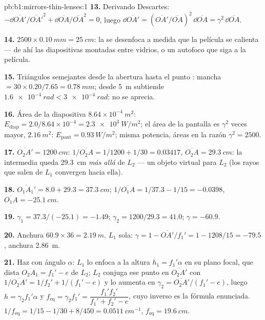 \begin{solution}{pb:b1:mirrors-thin-lenses:1}
\textbf{13.} Derivando Descartes: $-\dd\overline{OA'}/\overline{OA'}^2
+ \dd\overline{OA}/\overline{OA}^2 = 0$, luego $\dd\overline{OA'} =
(\overline{OA'}/\overline{OA})^2\,\dd\overline{OA} = \gamma^2\,\dd\overline{OA}$.

\textbf{14.} $2500 \times \qty{0.10}{mm} = \qty{25}{cm}$: la  se
desenfoca a medida que la película se calienta --- de ahí las diapositivas
montadas entre vidrios, o un autofoco que siga a la película.

\textbf{15.} Triángulos semejantes desde la abertura hasta el punto
: mancha $= 30 \times 0.20/7.65 = \qty{0.78}{mm}$; desde \qty{5}{m}
subtiende $\qty{1.6e-4}{rad} < \qty{3e-4}{rad}$: no se aprecia.

\textbf{16.} Área de la diapositiva $8.64\times10^{-4}\ \unit{m^2}$: $E_{\text{diap}}
= 2.0/8.64\times10^{-4} = \qty{2.3e3}{W/m^2}$; el área de la pantalla es $\gamma^2$
veces mayor, $\qty{2.16}{m^2}$: $E_{\text{pant}} = \qty{0.93}{W/m^2}$;
misma potencia, áreas en la razón $\gamma^2 = 2500$.

\textbf{17.} $\overline{O_2A'} = \qty{1200}{cm}$: $1/\overline{O_2A} =
1/1200 + 1/30 = 0.03417$, $\overline{O_2A} = \qty{+29.3}{cm}$: la 
intermedia queda \qty{29.3}{cm} \emph{más allá} de $L_2$ --- un objeto
virtual para $L_2$ (los rayos que salen de $L_1$ convergen hacia ella).

\textbf{18.} $\overline{O_1A_1'} = 8.0 + 29.3 = \qty{37.3}{cm}$;
$1/\overline{O_1A} = 1/37.3 - 1/15 = -0.0398$, $\overline{O_1A} =
\qty{-25.1}{cm}$.

\textbf{19.} $\gamma_1 = 37.3/(-25.1) = -1.49$; $\gamma_2 = 1200/29.3 =
41.0$; $\gamma = -60.9$.

\textbf{20.} Anchura $60.9 \times 36 = \qty{2.19}{m}$. $L_1$ sola:
$\gamma = 1 - \overline{OA'}/f_1' = 1 - 1208/15 = -79.5$, anchura
\qty{2.86}{m}.

\textbf{21.} Haz con ángulo $\alpha$: $L_1$ lo enfoca a la altura $h_1 = f_1'\alpha$
en su plano focal, que dista $\overline{O_2A_1} = f_1' - e$ de $L_2$;
$L_2$ conjuga ese punto en $\overline{O_2A'}$ con $1/\overline{O_2A'}
= 1/f_2' + 1/(f_1' - e)$ y lo aumenta en $\gamma_2 = \overline{O_2A'}/(f_1'
- e)$, luego $h = \gamma_2 f_1'\alpha$ y $f_{\mathrm{eq}} = \gamma_2 f_1'
= \dfrac{f_1' f_2'}{f_1' + f_2' - e}$, cuyo inverso es la fórmula
enunciada. $1/f_{\mathrm{eq}} = 1/15 - 1/30 + 8/450 = \qty{0.0511}{cm^{-1}}$,
$f_{\mathrm{eq}} = \qty{19.6}{cm}$.


\end{solution}
